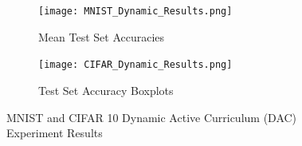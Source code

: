 \begin{figure}[h!]
\hspace*{-3cm}    
\centering
\begin{subfigure}{0.7\textwidth}
  \centering
  \texttt{[image: MNIST\_Dynamic\_Results.png]}
  \caption{ Mean Test Set Accuracies}
  \label{fig:DAC_ste_MNIST}
\end{subfigure}%
\begin{subfigure}{0.7\textwidth}
\hspace*{-1cm}   
  \centering
  \texttt{[image: CIFAR\_Dynamic\_Results.png]}
  \caption{Test Set Accuracy Boxplots}
  \label{fig:DAC_ste_CIFAR}
\end{subfigure}
\caption{MNIST and CIFAR 10 Dynamic Active Curriculum (DAC) Experiment Results}
\label{fig:DACResults}
\end{figure}